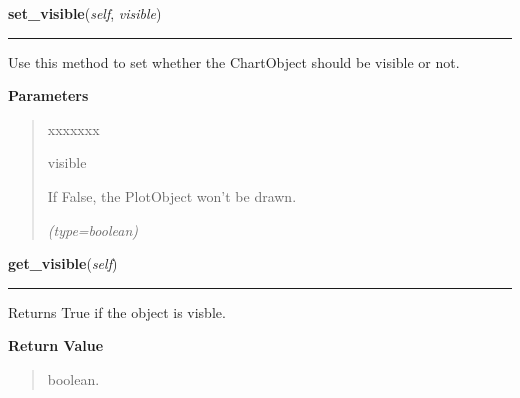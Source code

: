     \label{pygtk_chart:chart_object:ChartObject:set_visible}

    \vspace{0.5ex}

\hspace{.8\funcindent}\begin{boxedminipage}{\funcwidth}

    \raggedright \textbf{set\_visible}(\textit{self}, \textit{visible})

    \vspace{-1.5ex}

    \rule{\textwidth}{0.5\fboxrule}
\setlength{\parskip}{2ex}
    Use this method to set whether the ChartObject should be visible or 
    not.

\setlength{\parskip}{1ex}
      \textbf{Parameters}
      \vspace{-1ex}

      \begin{quote}
        \begin{Ventry}{xxxxxxx}

          \item[visible]

          If False, the PlotObject won't be drawn.

            {\it (type=boolean)}

        \end{Ventry}

      \end{quote}

    \end{boxedminipage}

    \label{pygtk_chart:chart_object:ChartObject:get_visible}

    \vspace{0.5ex}

\hspace{.8\funcindent}\begin{boxedminipage}{\funcwidth}

    \raggedright \textbf{get\_visible}(\textit{self})

    \vspace{-1.5ex}

    \rule{\textwidth}{0.5\fboxrule}
\setlength{\parskip}{2ex}
    Returns True if the object is visble.

\setlength{\parskip}{1ex}
      \textbf{Return Value}
    \vspace{-1ex}

      \begin{quote}
      boolean.

      \end{quote}

    \end{boxedminipage}


